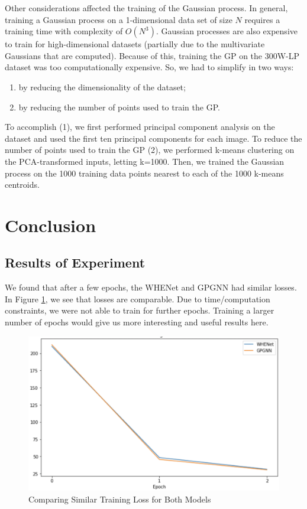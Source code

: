 \documentclass[11pt,letterpaper]{article}
\begin{document}
    Other considerations affected the training of the Gaussian process.
    In general, training a Gaussian process on a 1-dimensional data set of size $ N $ requires a training time with complexity of $ O(N^3) $.
    Gaussian processes are also expensive to train for high-dimensional datasets (partially due to the multivariate Gaussians that are computed).
    Because of this, training the GP on the 300W-LP dataset was too computationally expensive.
    So, we had to simplify in two ways:
    \begin{enumerate}[(1)]
       \item by reducing the dimensionality of the dataset;
       \item by reducing the number of points used to train the GP.
    \end{enumerate}
    To accomplish (1), we first performed principal component analysis on the dataset and used the first ten principal components for each image.
    To reduce the number of points used to train the GP (2), we performed k-means clustering on the PCA-transformed inputs, letting k=1000.
    Then, we trained the Gaussian process on the 1000 training data points nearest to each of the 1000 k-means centroids.


\section{Conclusion}
\subsection{Results of Experiment}
We found that after a few epochs, the WHENet and GPGNN had similar losses.
In Figure \ref{loss_fig}, we see that losses are comparable.
Due to time/computation constraints, we were not able to train for further epochs.
Training a larger number of epochs would give us more interesting and useful results here.

\begin{figure}[!htb]
\begin{center}
   \includegraphics[width=0.55\linewidth]{./pics/training_loss.png}
   \caption{Comparing Similar Training Loss for Both Models}
   \label{loss_fig}
\end{center}
\end{figure}
\end{document}
